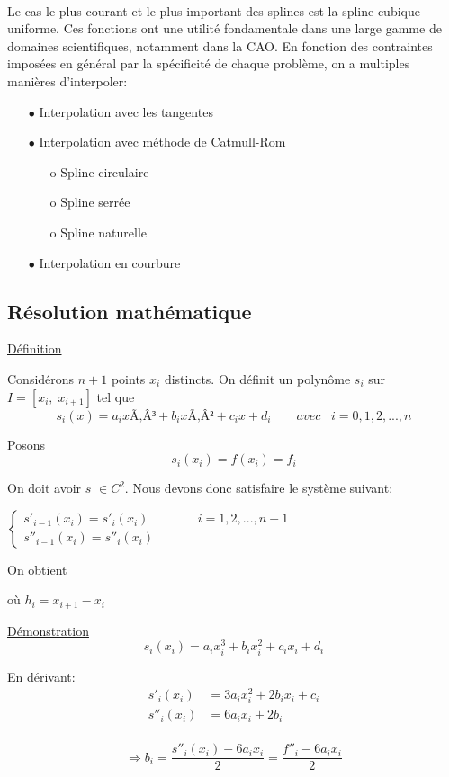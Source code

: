 \documentclass{article}
\begin{document}
\\
\indent
	Le cas le plus courant et le plus important des splines est la spline cubique uniforme. Ces fonctions ont une utilit\'{e} fondamentale dans une large gamme de domaines scientifiques, notamment dans la CAO. En fonction des contraintes impos\'{e}es en g\'{e}n\'{e}ral par la sp\'{e}cificit\'{e} de chaque probl\`{e}me, on a multiples mani\`{e}res d'interpoler:
\begin{itemize}
\item [$\bullet$] Interpolation avec les tangentes
\item [$\bullet$] Interpolation avec m\'{e}thode de Catmull-Rom
\begin{itemize}
\item[o] Spline circulaire
\item[o]Spline serr\'{e}e
\item[o] Spline naturelle
\end{itemize}
\item [$\bullet$] Interpolation en courbure
\end{itemize}

\newpage
\subsection{R\'esolution math\'ematique} 
\begingroup\raggedleft
\underline{D\'{e}finition}
\endgroup

Consid\'{e}rons $n+1$ points $x_i$ distincts. On d\'{e}finit un polyn\^{o}me $s_i$ sur \\
$I = [x_i, \; x_{i+1}]$ tel que \[s_i(x) = a_ixÃÂ³ + b_ixÃÂ² + c_ix + d_i\qquad avec \;\;\; i= 0, 1, 2,..., n\]

Posons
\[s_i(x_i)= f(x_i) = f_i\]

On doit avoir $s$ $\in C^2$. Nous devons donc satisfaire le syst\`{e}me suivant: \par
$\begin{cases}
s'_{i-1}(x_i)=s'_i(x_i)\;\;\;\;\;\;\;\;\;\;\;\;\;\;i=1,2,...,{n-1}\\
s''_{i-1}(x_i)=s''_i(x_i)
\end{cases}$
\\
\par
On obtient 
\begin{center}
 \;\;\;\;\;\; o\`u \; $h_i=x_{i+1}-x_i$
\end{center}

\underline{D\'{e}monstration}
\[s_i(x_i) = a_ix_i^{3} + b_ix_i^{2} + c_ix_i + d_i\]
\par
\begingroup\raggedleft
En d\'{e}rivant:
\endgroup 
\begin{align*} 
s'_i(x_i) & = 3a_ix_i^{2} + 2b_ix_i + c_i
\\[5pt] 
s''_i(x_i) & = 6a_ix_i + 2b_i
\end{align*} 
\\
\[\Rightarrow b_i=\frac{s''_i(x_i)-6a_ix_i}{2}=\frac{f''_i-6a_ix_i}{2}\] 
\end{document}

